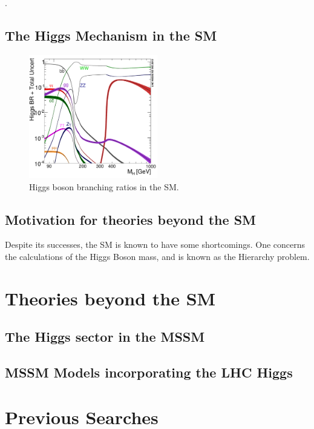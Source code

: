\cite{GlashowPartialSymmetries,WeinbergModelOfLeptons,SalamNobelSymposium}.

\subsection{The Higgs Mechanism in the \ac{SM}}
\label{sec:SMHiggs}


\begin{figure}[htbp]
   \includegraphics[width=0.5\textwidth]{plots/theory/Higgs_BR.pdf}
\caption{Higgs boson branching ratios in the \ac{SM}\cite{}.}
\label{fig:SMHiggsBRs}
\end{figure}


\subsection{Motivation for theories beyond the \ac{SM}}

Despite its successes, the \ac{SM} is known to have some shortcomings. One concerns
the calculations of the Higgs Boson mass, and is known as the Hierarchy problem. 

\section{Theories beyond the SM}
\label{sec:BSM}

\subsection{The Higgs sector in the MSSM}
\label{sec:mssmhiggs}

\subsection{MSSM Models incorporating the LHC Higgs}
\label{sec:mssmbenchmarks}

\section{Previous Searches}




